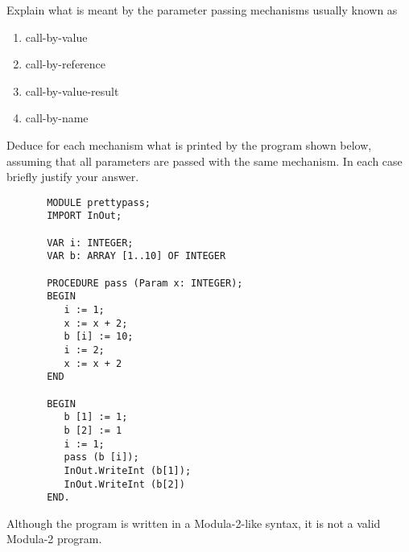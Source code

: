 \question
        Explain what is meant by the parameter passing mechanisms usually
        known as
                \begin{enumerate}
                \item call-by-value
                \item call-by-reference
                \item call-by-value-result
                \item call-by-name
                \end{enumerate}
        Deduce for each mechanism what is printed by the 
        program shown below, assuming that all parameters are
	passed with the same mechanism.
        In each case briefly justify your answer.
\begin{verbatim}
       MODULE prettypass; 
       IMPORT InOut;

       VAR i: INTEGER;
       VAR b: ARRAY [1..10] OF INTEGER
 
       PROCEDURE pass (Param x: INTEGER);
       BEGIN
          i := 1;
          x := x + 2;
          b [i] := 10;
          i := 2;
          x := x + 2
       END

       BEGIN
          b [1] := 1;
          b [2] := 1
          i := 1;
          pass (b [i]);
          InOut.WriteInt (b[1]); 
          InOut.WriteInt (b[2])
       END.
\end{verbatim}                   
Although the program is written in a Modula-2-like syntax, it
is not a valid Modula-2 program.

